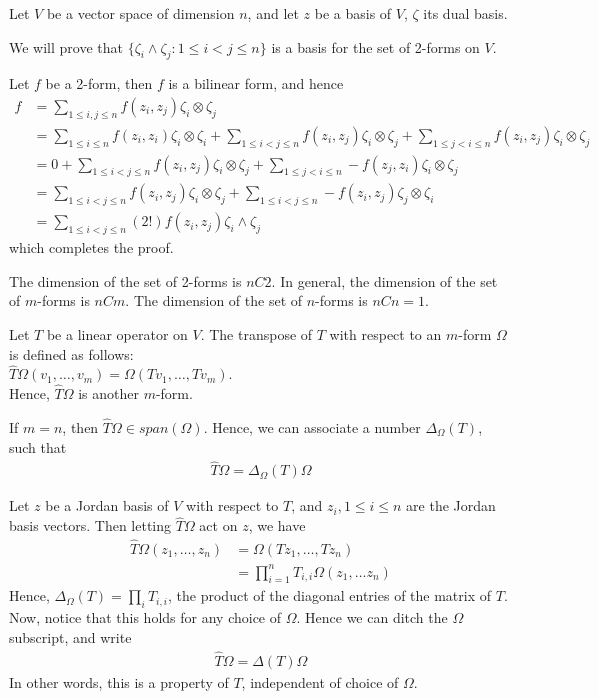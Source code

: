 \documentclass{article}
\begin{document}
Let $V$ be a vector space of dimension $n$, and let $z$ be a basis of $V$, $\zeta$ its dual basis.

We will prove that $\{\zeta_i \wedge \zeta_j : 1\leq i < j \leq n\}$ is a basis for the set of 2-forms on $V$.

Let $f$ be a 2-form, then $f$ is a bilinear form, and hence 
\begin{align*}
f &= \sum_{1\leq i,j\leq n}f(z_i, z_j)\zeta_i\otimes \zeta_j\\
&=\sum_{1\leq i\leq n}f(z_i, z_i)\zeta_i\otimes \zeta_i
+ \sum_{1\leq i < j\leq n}f(z_i, z_j)\zeta_i\otimes \zeta_j
+ \sum_{1\leq j < i\leq n}f(z_i, z_j)\zeta_i\otimes \zeta_j\\
&= 0 + \sum_{1\leq i < j\leq n}f(z_i, z_j)\zeta_i\otimes \zeta_j
+ \sum_{1\leq j < i\leq n}-f(z_j, z_i)\zeta_i\otimes \zeta_j\\
&=\sum_{1\leq i < j\leq n}f(z_i, z_j)\zeta_i\otimes \zeta_j
+ \sum_{1\leq i < j\leq n}-f(z_i, z_j)\zeta_j\otimes \zeta_i\\
&= \sum_{1\leq i < j\leq n}(2!)f(z_i, z_j)\zeta_i\wedge \zeta_j
\end{align*}
which completes the proof.

The dimension of the set of 2-forms is $nC2$. In general, the dimension of the set of $m$-forms is $nCm$. The dimension of the set of $n$-forms is $nCn=1$.

Let $T$ be a linear operator on $V$. The transpose of $T$ with respect to an $m$-form $\Omega$ is defined as follows:\\
$\hat{T}\Omega(v_1, \dots, v_m) = \Omega(Tv_1, \dots, Tv_m)$.\\
Hence, $\hat{T}\Omega$ is another $m$-form.

If $m=n$, then $\hat{T}\Omega \in span(\Omega)$. Hence, we can associate a number $\Delta_\Omega(T)$, such that 
\begin{align*}
	\hat{T}\Omega = \Delta_\Omega(T)\Omega
\end{align*}

Let $z$ be a Jordan basis of $V$ with respect to $T$, and $z_i, 1\leq i\leq n$ are the Jordan basis vectors. Then letting $\hat{T}\Omega$ act on $z$, we have
\begin{align*}
	\hat{T}\Omega(z_1, \dots, z_n)
	&= \Omega(Tz_1, \dots, Tz_n) \\
	&= \prod_{i=1}^n T_{i,i} \Omega(z_1, \dots z_n)
\end{align*}
Hence, $\Delta_\Omega(T) = \prod_iT_{i,i}$, the product of the diagonal entries of the matrix of $T$.\\
Now, notice that this holds for any choice of $\Omega$. Hence we can ditch the $\Omega$ subscript, and write
\begin{align*}
	\hat{T}\Omega = \Delta(T)\Omega
\end{align*}
In other words, this is a property of $T$, independent of choice of $\Omega$.
\end{document}

